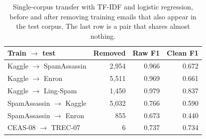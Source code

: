 \begin{table}[t]
\caption{Single-corpus transfer with TF-IDF and logistic regression, before and after removing training emails that also appear in the test corpus. The last row is a pair that shares almost nothing.}
\label{tab:pairwise}
\centering\footnotesize
\setlength{\tabcolsep}{3pt}
\begin{tabular}{lrrr}
\toprule
Train $\rightarrow$ test & Removed & Raw F1 & Clean F1 \\
\midrule
Kaggle $\rightarrow$ SpamAssassin & 2,954 & 0.966 & 0.672 \\
Kaggle $\rightarrow$ Enron & 5,511 & 0.969 & 0.661 \\
Kaggle $\rightarrow$ Ling-Spam & 1,450 & 0.979 & 0.837 \\
SpamAssassin $\rightarrow$ Kaggle & 5,032 & 0.766 & 0.590 \\
SpamAssassin $\rightarrow$ Enron & 855 & 0.673 & 0.440 \\
CEAS-08 $\rightarrow$ TREC-07 & 6 & 0.737 & 0.734 \\
\bottomrule
\end{tabular}
\end{table}
